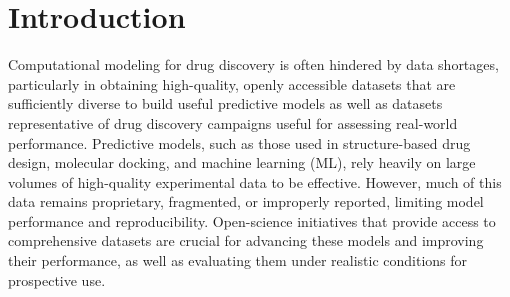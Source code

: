 \documentclass[journal=jcim,manuscript=article]{achemso}
\begin{document}
\section{Introduction}
Computational modeling for drug discovery is often hindered by data shortages, particularly in obtaining high-quality, openly accessible datasets that are sufficiently diverse to build useful predictive models as well as datasets representative of drug discovery campaigns useful for assessing real-world performance\cite{van_tilborg_deep_2024, volkamer_machine_2023}.  Predictive models, such as those used in structure-based drug design, molecular docking, and machine learning (ML), rely heavily on  large volumes of high-quality experimental data to be effective. However, much of this data remains proprietary, fragmented, or improperly reported, limiting model performance and reproducibility\cite{baker_1500_2016, ash_practically_2024, kapoor_leakage_2023, wognum_call_2024, volkamer_machine_2023}. Open-science initiatives that provide access to comprehensive datasets are crucial for advancing these models and improving their performance, as well as evaluating them under realistic conditions for prospective use.
\end{document}

